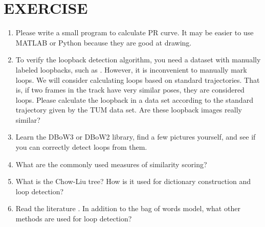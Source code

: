 \section *{EXERCISE}
\begin{enumerate}
\item Please write a small program to calculate PR curve. It may be easier to use MATLAB or Python because they are good at drawing.
\item To verify the loopback detection algorithm, you need a dataset with manually labeled loopbacks, such as \cite{Cummins2008}. However, it is inconvenient to manually mark loops. We will consider calculating loops based on standard trajectories. That is, if two frames in the track have very similar poses, they are considered loops. Please calculate the loopback in a data set according to the standard trajectory given by the TUM data set. Are these loopback images really similar?
\item Learn the DBoW3 or DBoW2 library, find a few pictures yourself, and see if you can correctly detect loops from them.
\item What are the commonly used measures of similarity scoring?
\item What is the Chow-Liu tree? How is it used for dictionary construction and loop detection?
\item Read the literature \cite{Williams2009}. In addition to the bag of words model, what other methods are used for loop detection?
\end{enumerate}
